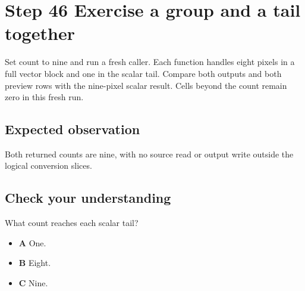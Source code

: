 \section{Step 46 Exercise a group and a tail together}\label{rgb-s46}

Set count to nine and run a fresh caller. Each function handles eight pixels in a full vector block and one in the scalar tail. Compare both outputs and both preview rows with the nine-pixel scalar result. Cells beyond the count remain zero in this fresh run.

\subsection{Expected observation}
Both returned counts are nine, with no source read or output write outside the logical conversion slices.

\subsection{Check your understanding}
What count reaches each scalar tail?

\begin{itemize}
  \item \textbf{A} One.
  \item \textbf{B} Eight.
  \item \textbf{C} Nine.
\end{itemize}
